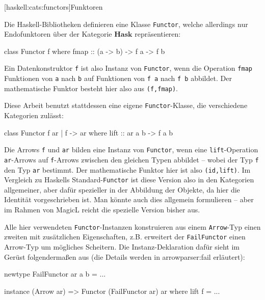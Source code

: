 \documentclass[11pt, a4paper, bibgerm]{scrbook}
\newenvironment{DIFnomarkup}{}{}
\newcommand\icode[1]{\lstinline?#1?}
\newcommand\lsubsection{}
\newcommand\sref{}
\begin{document}
\lsubsection[haskell:cats:functors]{Funktoren}

Die Haskell-Bibliotheken definieren eine Klasse \icode{Functor}, welche
allerdings nur Endofunktoren über der Kategorie $\mathbf{Hask}$ repräsentieren:
\begin{DIFnomarkup}\begin{code}
class Functor f where
  fmap :: (a -> b) -> f a -> f b
\end{code}\end{DIFnomarkup}
Ein Datenkonstruktor \icode{f} ist also Instanz von \icode{Functor},
wenn die Operation \icode{fmap} Funktionen von \icode{a} nach \icode{b}
auf Funktionen von \icode{f a} nach \icode{f b} abbildet. Der
mathematische Funktor besteht hier also aus \icode{(f,fmap)}.

Diese Arbeit benutzt stattdessen eine eigene \icode{Functor}-Klasse,
die verschiedene Kategorien zulässt:
\begin{DIFnomarkup}\begin{code}
class Functor f ar | f -> ar where
  lift :: ar a b -> f a b
\end{code}\end{DIFnomarkup}
Die Arrows \icode{f} und \icode{ar} bilden eine Instanz von
\icode{Functor}, wenn eine \icode{lift}-Operation \icode{ar}-Arrows auf
\icode{f}-Arrows zwischen den gleichen Typen abbildet -- wobei der Typ
\icode{f} den Typ \icode{ar} bestimmt. Der mathematische Funktor
hier ist also \icode{(id,lift)}. Im Vergleich zu Haskells
Standard-\icode{Functor} ist diese Version also in den Kategorien
allgemeiner, aber dafür spezieller in der Abbildung der Objekte, da hier
die Identität vorgeschrieben ist. Man könnte auch dies allgemein
formulieren -- aber im Rahmen von MagicL reicht die spezielle Version
bisher aus.

Alle hier verwendeten \icode{Functor}-Instanzen konstruieren aus einem
\icode{Arrow}-Typ einen zweiten mit zusätzlichen Eigenschaften,
z.B. erweitert der \icode{FailFunctor} einen Arrow-Typ um mögliches
Scheitern. Die Instanz-Deklaration dafür sieht im Gerüst folgendermaßen
aus (die Details werden in \sref{arrowparser:fail} erläutert):
\begin{DIFnomarkup}\begin{code}
newtype FailFunctor ar a b = ...

instance (Arrow ar) => Functor (FailFunctor ar) ar where
  lift f = ...
\end{code}\end{DIFnomarkup}
\end{document}
